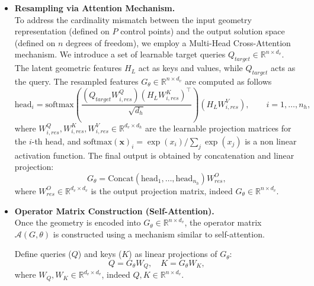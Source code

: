 \documentclass{article}
\newcommand{\mm}[1]{\todo[color=orange!20]{\textbf{MM:} #1}}
\newcommand{\R}{\mathbb{R}}
\newcommand{\Dlat}{d_v} %
\theoremstyle{plain}
\numberwithin{equation}{section}
\begin{document}
\begin{itemize}
    \item \textbf{Resampling via Attention Mechanism.}\\
          To address the cardinality mismatch between the input geometry representation (defined on $P$ control points) and the output solution space (defined on $n$ degrees of freedom), we employ a Multi-Head Cross-Attention mechanism. We introduce a set of learnable target queries $Q_{target} \in \R^{n \times \Dlat}$. The latent geometric features $H_L$ act as keys and values, while $Q_{target}$ acts as the query. %
          The resampled features $G_\theta \in \R^{n \times \Dlat}$ are computed as follows
          \begin{equation*}
              \text{head}_i = \text{softmax} \left( \frac{(Q_{target}W^Q_{i, res}) (H_L W^K_{i, res})^\top}{\sqrt{d_h}} \right) (H_L W^V_{i, res}), \qquad i=1, \ldots, n_h,
          \end{equation*}
          where $W^Q_{i, res}, W^K_{i, res}, W^V_{i, res} \in \R^{\Dlat \times d_h}$ are the learnable projection matrices for the $i$-th head, and $\text{softmax}(\mathbf{x})_i = \exp(x_i) / \sum_j \exp(x_j)$ is a non linear activation function. The final output is obtained by concatenation and linear projection:
          \begin{equation*}
              G_\theta = \text{Concat}(\text{head}_1, \ldots, \text{head}_{n_h}) W^O_{res},
          \end{equation*}
          where $W^O_{res} \in \R^{\Dlat \times \Dlat}$ is the output projection matrix, indeed $G_\theta \in \mathbb{R}^{n \times \Dlat}$.

    \item \textbf{Operator Matrix Construction (Self-Attention).}\\
          Once the geometry is encoded into $G_\theta \in \mathbb{R}^{n \times \Dlat}$, the operator matrix $\mathcal{A}(G, \theta)$ is constructed using a mechanism similar to self-attention.

          Define queries ($Q$) and keys ($K$) as linear projections of $G_\theta$:
          \begin{equation*}
              Q = G_\theta W_Q, \quad K = G_\theta W_K,
          \end{equation*}
          where $W_Q, W_K \in \R^{\Dlat\times \Dlat}$, indeed $Q, K \in \mathbb{R}^{n \times \Dlat}$.


\end{itemize}
\end{document}
